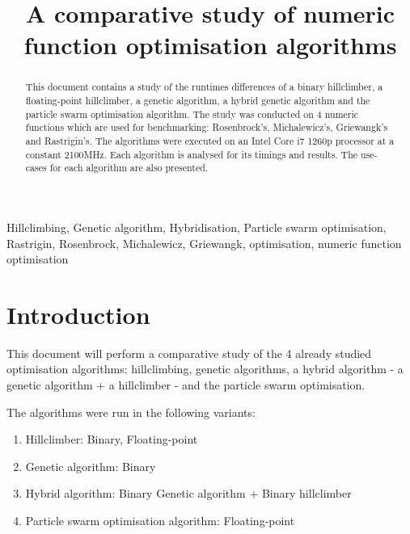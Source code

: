 \documentclass[conference]{IEEEtran}
\begin{document}
\title{A comparative study of numeric function optimisation algorithms}

\author{
}
\maketitle

\begin{abstract}
    This document contains a study of the runtimes differences of a binary hillclimber, a floating-point hillclimber, a
    genetic algorithm, a hybrid genetic algorithm and the particle swarm optimisation algorithm. The study was conducted on
    4 numeric functions which are used for benchmarking: Rosenbrock's, Michalewicz's, Griewangk's and Rastrigin's. The algorithms
    were executed on an Intel Core i7 1260p processor at a constant 2100MHz. Each algorithm is analysed for its timings and
    results. The use-cases for each algorithm are also presented.
\end{abstract}

\begin{IEEEkeywords}
Hillclimbing, Genetic algorithm, Hybridisation, Particle swarm optimisation, Rastrigin, Rosenbrock, Michalewicz, Griewangk, optimisation, numeric function optimisation
\end{IEEEkeywords}

\section{Introduction}
This document will perform a comparative study of the 4 already studied optimisation algorithms: hillclimbing, genetic algorithms,
a hybrid algorithm - a genetic algorithm + a hillclimber - and the particle swarm optimisation.

The algorithms were run in the following variants:

\begin{enumerate}
    \item Hillclimber: Binary, Floating-point
    \item Genetic algorithm: Binary
    \item Hybrid algorithm: Binary Genetic algorithm + Binary hillclimber
    \item Particle swarm optimisation algorithm: Floating-point
\end{enumerate}
\end{document}
